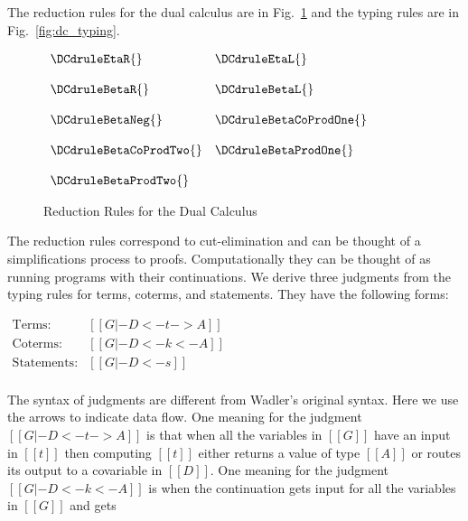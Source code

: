 The reduction rules for the dual calculus are in Fig.~\ref{fig:dc_red}
and the typing rules are in Fig.~\ref{fig:dc_typing}.  
\begin{figure}
  \begin{center}
    \begin{math}
      \begin{array}{lll}
        \DCdruleEtaR{} & \DCdruleEtaL{}\\
        &\\
        \DCdruleBetaR{} & \DCdruleBetaL{}\\
        &\\
        \DCdruleBetaNeg{} & \DCdruleBetaCoProdOne{}\\
        &\\
        \DCdruleBetaCoProdTwo{} & \DCdruleBetaProdOne{}\\
        &\\
        \DCdruleBetaProdTwo{}
      \end{array}
    \end{math}
  \end{center}
  \caption{Reduction Rules for the Dual Calculus}
  \label{fig:dc_red}
\end{figure}
The reduction rules correspond to cut-elimination and can be thought
of a simplifications process to proofs.  Computationally they can be
thought of as running programs with their continuations.  We derive
three judgments from the typing rules for terms, coterms, and
statements.  They have the following forms:
\begin{center}
  \begin{math}
    \begin{array}{lll}
      \text{Terms}:      & [[G |- D <- t -> A]]\\
      \text{Coterms}:    & [[G |- D <- k <- A]]\\
      \text{Statements}: & [[G |- D <- s]]\\
    \end{array}
  \end{math}
\end{center}
The syntax of judgments are different from Wadler's original syntax.
Here we use the arrows to indicate data flow.  One meaning for the
judgment $[[G |- D <- t -> A]]$ is that when all the variables in
$[[G]]$ have an input in $[[t]]$ then computing $[[t]]$ either returns
a value of type $[[A]]$ or routes its output to a covariable in
$[[D]]$.  One meaning for the judgment $[[G |- D <- k <- A]]$ is when
the continuation gets input for all the variables in $[[G]]$ and gets
